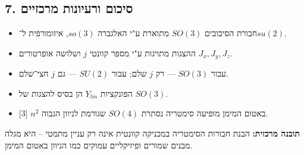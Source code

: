 \subsection*{7. סיכום ורעיונות מרכזיים}
\begin{itemize}
    \item חבורת הסיבובים $SO(3)$ מתוארת ע"י האלגברה $so(3)$, איזומורפית ל־$su(2)$.
    \item ההצגות מתויגות ע"י מספר קוונטי $j$ ושלושה אופרטורים $J_x, J_y, J_z$.
    \item עבור $SO(3)$ — רק $j$ שלם; עבור $SU(2)$ — גם $j$ חצי־שלם.
    \item הפונקציות $Y_{lm}$ הן בסיס להצגות של $SO(3)$.
    \item באטום המימן מופיעה סימטריה נסתרת $SO(4)$ שגורמת לניוון הגבוה $n^2$ [3].
\end{itemize}

\begin{summarybox}
\textbf{תובנה מרכזית:}  
הבנת חבורות הסימטריה במכניקה קוונטית אינה רק עניין מתמטי –  
היא מגלה מבנים שמורים ופיזיקליים עמוקים כמו הניוון באטום המימן.
\end{summarybox}